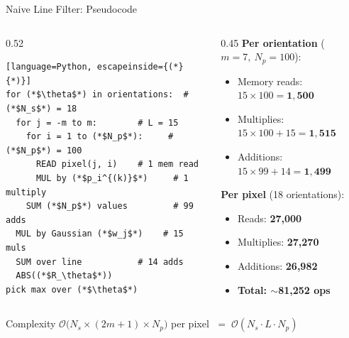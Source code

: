 \documentclass[10pt, aspectratio=169]{beamer}
\begin{document}
\begin{frame}[fragile]{Naive Line Filter: Pseudocode}
  \begin{columns}[T]
    \begin{column}{0.52\textwidth}
      \begin{lstlisting}[language=Python, escapeinside={(*}{*)}]
for (*$\theta$*) in orientations:  # (*$N_s$*) = 18
  for j = -m to m:        # L = 15
    for i = 1 to (*$N_p$*):     # (*$N_p$*) = 100
      READ pixel(j, i)    # 1 mem read
      MUL by (*$p_i^{(k)}$*)     # 1 multiply
    SUM (*$N_p$*) values         # 99 adds
  MUL by Gaussian (*$w_j$*)    # 15 muls
  SUM over line           # 14 adds
  ABS((*$R_\theta$*))
pick max over (*$\theta$*)
      \end{lstlisting}
    \end{column}
    \begin{column}{0.45\textwidth}
      \textbf{Per orientation} ($m{=}7,\ N_p{=}100$):
      \begin{itemize}
        \item Memory reads: $15 \times 100 = \mathbf{1{,}500}$
        \item Multiplies: $15 \times 100 + 15 = \mathbf{1{,}515}$
        \item Additions: $15 \times 99 + 14 = \mathbf{1{,}499}$
      \end{itemize}

      \vspace{0.6em}
      \textbf{Per pixel} (18 orientations):
      \begin{itemize}
        \item Reads: \textbf{27,000}
        \item Multiplies: \textbf{27,270}
        \item Additions: \textbf{26,982}
        \item[\color{UofSCGarnet}$\blacksquare$] \textbf{Total: $\sim$81,252 ops}
      \end{itemize}
    \end{column}
  \end{columns}

  \vspace{0.3em}
  \begin{alertblock}{Complexity}
    $\mathcal{O}\!\bigl(N_s \times (2m{+}1) \times N_p\bigr)$ per pixel $\;=\; \mathcal{O}(N_s \cdot L \cdot N_p)$
  \end{alertblock}
\end{frame}
\end{document}

